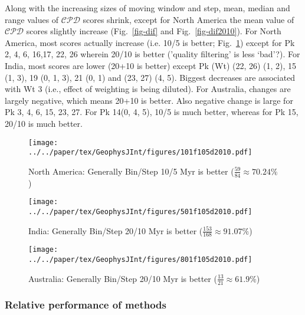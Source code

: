 Along with the increasing sizes of moving window and step, mean, median and
range values of $\mathcal{CPD}$ scores shrink, except for North America the mean
value of $\mathcal{CPD}$ scores slightly increase (Fig.~\ref{fig-dif} and
Fig.~\ref{fig-dif2010}). For North America, most scores actually increase (i.e.
10/5 is better; Fig.~\ref{fig-101f105d2010}) except for Pk 2, 4, 6, 16,17, 22,
26 wherein 20/10 is better ('quality filtering' is less `bad’?). For India, most
scores are lower (20+10 is better) except Pk (Wt) (22, 26) (1, 2), 15 (1, 3),
19 (0, 1, 3), 21 (0, 1) and (23, 27) (4, 5). Biggest decreases are associated
with Wt 3 (i.e., effect of weighting is being diluted). For Australia, changes
are largely negative, which means 20+10 is better. Also negative change is large
for Pk 3, 4, 6, 15, 23, 27. For Pk 14(0, 4, 5), 10/5 is much
better, whereas for Pk 15, 20/10 is much better.

\begin{figure*}
	\centering
	\begin{subfigure}{1\textwidth}
		\texttt{[image: ../../paper/tex/GeophysJInt/figures/101f105d2010.pdf]}
		\caption{North America: Generally Bin/Step 10/5 Myr is better
		($\frac{59}{84}\approx70.24\%$)}\label{fig-101f105d2010}
	\end{subfigure}
	\vspace{.1em}
	\begin{subfigure}{1\textwidth}
		\texttt{[image: ../../paper/tex/GeophysJInt/figures/501f105d2010.pdf]}
		\caption{India: Generally Bin/Step 20/10 Myr is better
		($\frac{153}{168}\approx91.07\%$)}\label{fig-501f105d2010}
	\end{subfigure}
	\vspace{.1em}
	\begin{subfigure}{1\textwidth}
		\texttt{[image: ../../paper/tex/GeophysJInt/figures/801f105d2010.pdf]}
		\caption{Australia: Generally Bin/Step 20/10 Myr is better
		($\frac{13}{21}\approx61.9\%$)}\label{fig-801f105d2010}
	\end{subfigure}
	\caption[]{Differences between grids in Fig.~\ref{fig-dif} (10 Myr bin, 5
Myr step) and Fig.~\ref{fig-dif2010} (20 Myr bin, 10 Myr step). The absolute
difference values less than 1.96-standard-deviation interval of the whole 168
values are labeled in green, more than 1.96-standard-deviation interval labeled
in red.}\label{fig-f105d2010}
\end{figure*}

\subsubsection{Relative performance of methods}


